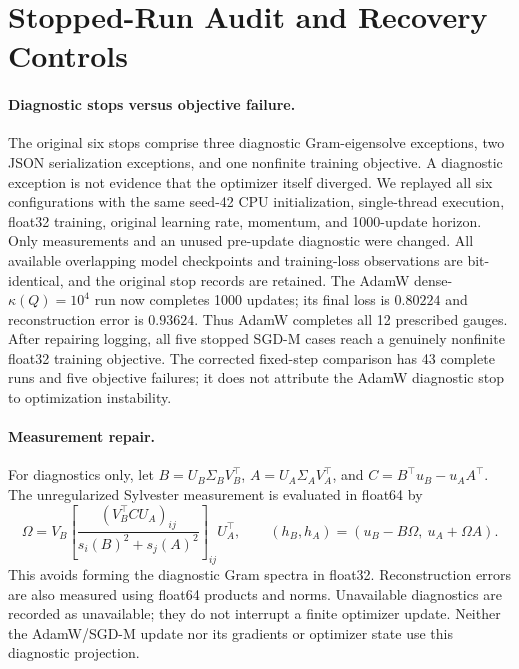 \section{Stopped-Run Audit and Recovery Controls}
\label{app:failure-recovery}
\paragraph{Diagnostic stops versus objective failure.}
The original six stops comprise three diagnostic Gram-eigensolve exceptions, two JSON serialization exceptions, and one nonfinite training objective. A diagnostic exception is not evidence that the optimizer itself diverged. We replayed all six configurations with the same seed-42 CPU initialization, single-thread execution, float32 training, original learning rate, momentum, and 1000-update horizon. Only measurements and an unused pre-update diagnostic were changed. All available overlapping model checkpoints and training-loss observations are bit-identical, and the original stop records are retained.
The AdamW dense-$\kappa(Q)=10^4$ run now completes 1000 updates; its final loss is $0.80224$ and reconstruction error is $0.93624$. Thus AdamW completes all 12 prescribed gauges. After repairing logging, all five stopped SGD-M cases reach a genuinely nonfinite float32 training objective. The corrected fixed-step comparison has 43 complete runs and five objective failures; it does not attribute the AdamW diagnostic stop to optimization instability.
\paragraph{Measurement repair.}
For diagnostics only, let $B=U_B\Sigma_BV_B^\top$, $A=U_A\Sigma_AV_A^\top$, and $C=B^\top u_B-u_AA^\top$. The unregularized Sylvester measurement is evaluated in float64 by
\begin{equation}
\Omega=V_B\left[\frac{(V_B^\top C U_A)_{ij}}{s_i(B)^2+s_j(A)^2}\right]_{ij}U_A^\top,\qquad
(h_B,h_A)=(u_B-B\Omega,\ u_A+\Omega A).
\end{equation}
This avoids forming the diagnostic Gram spectra in float32. Reconstruction errors are also measured using float64 products and norms. Unavailable diagnostics are recorded as unavailable; they do not interrupt a finite optimizer update. Neither the AdamW/SGD-M update nor its gradients or optimizer state use this diagnostic projection.
